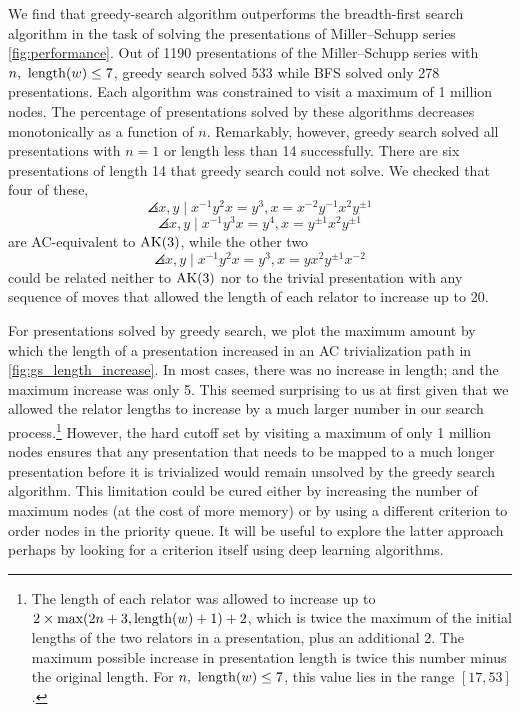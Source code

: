We find that greedy-search algorithm outperforms the breadth-first search algorithm in the task of solving the presentations of Miller--Schupp series \autoref{fig:performance}.
Out of 1190 presentations of the Miller--Schupp series with $n, \ \operatorname{length}(w) \leq 7$, greedy search solved 533 while BFS solved only 278 presentations.
Each algorithm was constrained to visit a maximum of 1 million nodes.
The percentage of presentations solved by these algorithms decreases monotonically as a function of $n$.
Remarkably, however, greedy search solved all presentations with $n=1$ or length less than 14 successfully.
There are six presentations of length 14 that greedy search could not solve.
We checked that four of these,
\[
\angles{x, y \mid x^{-1} y^2 x = y^{3} , x = x^{-2} y^{-1} x^2 y^{\pm 1}}
\]
\[
\angles{x, y \mid x^{-1} y^3 x = y^{4} , x = y^{\pm 1} x^2 y^{\pm 1}}
\]
are AC-equivalent to $\text{AK}(3)$, while the other two
\[
\angles{x, y \mid x^{-1} y^2 x = y^{3} , x = y x^2 y^{\pm 1} x^{-2}}
\]
could be related neither to $\text{AK}(3)$ nor to the trivial presentation with any sequence of moves that allowed the length of each relator to increase up to 20.
\newline

For presentations solved by greedy search, we plot the maximum amount by which the length of a presentation increased in an AC trivialization path in \autoref{fig:gs_length_increase}.
In most cases, there was no increase in length; and the maximum increase was only 5.
This seemed surprising to us at first given that we allowed the relator lengths to increase by a much larger number in our search process.\footnote{
The length of each relator was allowed to increase up to \(2 \times \text{max}(2n+3, \operatorname{length}(w)+1) + 2\), which is twice the maximum of the initial lengths of the two relators in a presentation, plus an additional 2.
The maximum possible increase in presentation length is twice this number minus the original length.
For $n, \ \operatorname{length}(w) \leq 7$, this value lies in the range $[17, 53]$.
}
However, the hard cutoff set by visiting a maximum of only 1 million nodes ensures that any presentation that needs to be mapped to a much longer presentation before it is trivialized would remain unsolved by the greedy search algorithm.
This limitation could be cured either by increasing the number of maximum nodes (at the cost of more memory) or by using a different criterion to order nodes in the priority queue.
It will be useful to explore the latter approach perhaps by looking for a criterion itself using deep learning algorithms.
\newline

